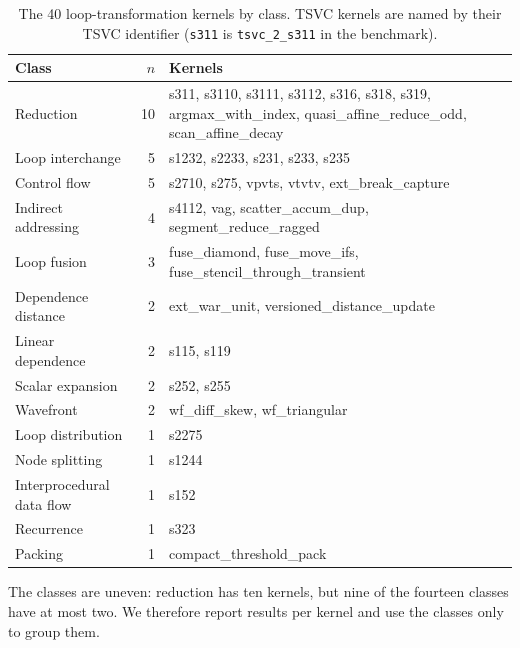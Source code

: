 \begin{table}[t]
  \centering
  \small
  \begin{tabular}{@{}lrp{7.6cm}@{}}
    \toprule
    Class & $n$ & Kernels \\
    \midrule
    Reduction            & 10 & s311, s3110, s3111, s3112, s316, s318, s319, argmax\_with\_index, quasi\_affine\_reduce\_odd, scan\_affine\_decay \\
    Loop interchange     &  5 & s1232, s2233, s231, s233, s235 \\
    Control flow         &  5 & s2710, s275, vpvts, vtvtv, ext\_break\_capture \\
    Indirect addressing  &  4 & s4112, vag, scatter\_accum\_dup, segment\_reduce\_ragged \\
    Loop fusion          &  3 & fuse\_diamond, fuse\_move\_ifs, fuse\_stencil\_through\_transient \\
    Dependence distance  &  2 & ext\_war\_unit, versioned\_distance\_update \\
    Linear dependence    &  2 & s115, s119 \\
    Scalar expansion     &  2 & s252, s255 \\
    Wavefront            &  2 & wf\_diff\_skew, wf\_triangular \\
    Loop distribution    &  1 & s2275 \\
    Node splitting       &  1 & s1244 \\
    Interprocedural data flow & 1 & s152 \\
    Recurrence           &  1 & s323 \\
    Packing              &  1 & compact\_threshold\_pack \\
    \bottomrule
  \end{tabular}
  \caption{The 40 loop-transformation kernels by class. TSVC kernels are named by their TSVC
    identifier (\texttt{s311} is \texttt{tsvc\_2\_s311} in the benchmark).}
  \label{tab:loop-classes}
\end{table}

The classes are uneven: reduction has ten kernels, but nine of the fourteen classes have at most
two. We therefore report results per kernel and use the classes only to group them.
